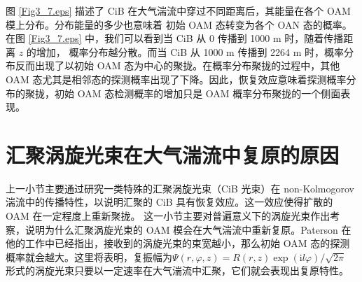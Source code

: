 \documentclass[master]{thesis-uestc}
\begin{document}
图 \ref{Fig3_7.eps} 描述了 CiB 在大气湍流中穿过不同距离后，其能量在各个 OAM 模上分布。分布能量的多少也意味着 初始 OAM 态转变为各个 OAN 态的概率。在图 \ref{Fig3_7.eps} 中，我们可以看到当 CiB 从 0 传播到 1000 m 时，随着传播距离 $z$ 的增加， 概率分布越分散。而当 CiB 从 1000 m 传播到 2264 m 时，概率分布反而出现了以初始 OAM 态为中心的聚拢。在概率分布聚拢的过程中，其他 OAM 态尤其是相邻态的探测概率出现了下降。因此，恢复效应意味着探测概率分布的聚拢，初始 OAM 态检测概率的增加只是 OAM 概率分布聚拢的一个侧面表现。

\section{汇聚涡旋光束在大气湍流中复原的原因}
上一小节主要通过研究一类特殊的汇聚涡旋光束（CiB 光束）在 non-Kolmogorov 湍流中的传播特性，以说明汇聚的 CiB 具有恢复效应。这一效应使得扩散的 OAM 在一定程度上重新聚拢。 这一小节主要对普遍意义下的涡旋光束作出考察，说明为什么汇聚涡旋光束的 OAM 模会在大气湍流中重新复原。Paterson 在他的工作中已经指出，接收到的涡旋光束的束宽越小，那么初始 OAM 态的探测概率就会越大\citeup{}。这里将表明，复振幅为$\Psi(r,\varphi,z)=R(r,z)\exp{(\mathrm{i}l\varphi)/\sqrt{2\pi}}$ 形式的涡旋光束只要以一定速率在大气湍流中汇聚，它们就会表现出复原特性。
\end{document}
